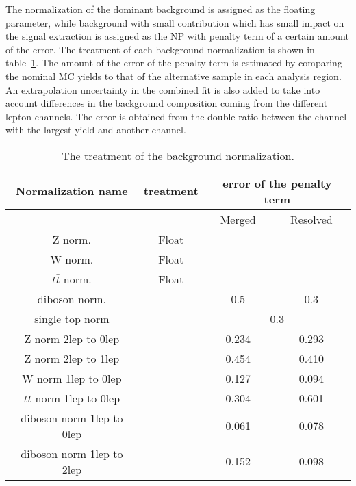 The normalization of the dominant background is assigned as the floating parameter, while background with small contribution which has small impact on the signal extraction is assigned as the NP with penalty term of a certain amount of the error.
The treatment of each background normalization is shown in table~\ref{tab:bkgnorm}.
The amount of the error of the penalty term is estimated by comparing the nominal MC yields to that of the alternative sample in each analysis region.
An extrapolation uncertainty in the combined fit is also added to take into account differences in the background composition coming from the different lepton channels. The error is obtained from the double ratio between the channel with the largest yield and another channel.
\begin{table}[htbp]
 \footnotesize
\begin{center}
\begin{tabular}{ | c | c | c | c |} \hline
Normalization name        & treatment   & \multicolumn{2}{|c|}{error of the penalty term} \\ \hline \hline
\multicolumn{2}{|c|}{}                     & Merged    & Resolved  \\ \hline 
Z norm.             & Float       &      &\\ \hline
W norm.             & Float       &       &\\ \hline 
$t\bar{t}$ norm.    & Float       &       &\\ \hline
diboson norm.     &             & 0.5    &  0.3 \\ \hline
single top norm           &             & \multicolumn{2}{|c|}{0.3}\\ \hline \hline
Z norm 2lep to 0lep        &             & 0.234  &   0.293 \\ \hline
Z norm 2lep to 1lep       &             & 0.454  &  0.410  \\ \hline
W norm 1lep to 0lep       &             & 0.127     & 0.094\\ \hline
$t\bar{t}$ norm 1lep to 0lep     &             & 0.304     & 0.601\\ \hline
diboson norm 1lep to 0lep    &             & 0.061     &0.078 \\ \hline
diboson norm 1lep to 2lep       &             & 0.152     & 0.098\\ \hline
\end{tabular}
\caption{\label{tab:bkgnorm} The treatment of the background normalization. }
\end{center}
\end{table}

